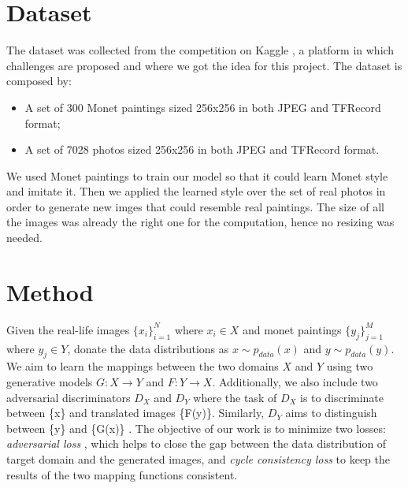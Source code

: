 \documentclass[10pt,twocolumn,letterpaper]{article}
\begin{document}
\section{Dataset}

The dataset was collected from the competition on Kaggle \cite{kaggle}, a platform in which challenges are proposed and where we got the idea for this project. The dataset is composed by:
\begin{itemize}
\item A set of 300 Monet paintings sized 256x256 in both JPEG and TFRecord format;
\item A set of 7028 photos sized 256x256 in both JPEG and TFRecord format.
\end{itemize}
We used Monet paintings to train our model so that it could learn Monet style and imitate it. Then we applied the learned style over the set of real photos in order to generate new imges that could resemble real paintings. The size of all the images was already the right one for the computation, hence no resizing was needed. 

\section{Method}
Given the real-life images $\{x_i\}_{i=1}^N$ where $x_{i}\in X$ and monet paintings $\{y_j\}_{j=1}^M$ where $y_{j}\in Y$, donate the data distributions as $x \sim p_{data}(x)$ and $y \sim p_{data}(y)$. We aim to learn the mappings between the two domains $X$ and $Y$ using two generative models $G : X \longrightarrow Y$ and $F : Y \longrightarrow X$. Additionally, we also include two adversarial discriminators $D_{X}$ and $D_{Y}$ where the task of $D_{X}$ is to discriminate between \{x\} and translated images \{F(y)\}. Similarly, $D_{Y}$ aims to distinguish between \{y\} and \{G(x)\} \cite{cyclegan}. The objective of our work is to minimize two losses: \emph{adversarial loss} \cite{simplegan}, which helps to close the gap between the data distribution of target domain and the generated images, and \emph{cycle consistency loss} to keep the results of the two mapping functions consistent.
\end{document}
